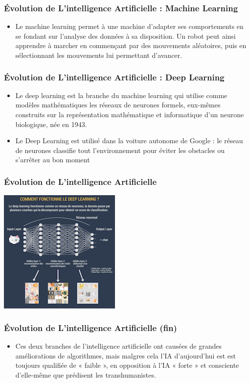 \documentclass{beamer}
\begin{document}
	\begin{frame}
	\frametitle{Évolution de L'intelligence  Artificielle : Machine Learning}
	\begin{itemize}
		\item Le machine learning permet à une machine d’adapter ses comportements en se fondant sur l’analyse des données à sa disposition. Un robot peut ainsi apprendre à marcher en commençant par des mouvements aléatoires, puis en sélectionnant les mouvements lui permettant d’avancer.
	\end{itemize}
	\end{frame}
	
	\begin{frame}
	\frametitle{Évolution de L'intelligence  Artificielle : Deep Learning}
	\begin{itemize}
		\itemsep1em
		\item Le deep learning est la branche du machine learning qui utilise comme modèles mathématiques les réseaux de neurones formels, eux-mêmes construits sur la représentation mathématique et informatique d’un neurone biologique, née en 1943.
		\item  Le Deep Learning est utilisé dans la voiture autonome  de Google : le réseau de  neurones 	classifie tout l’environnement pour éviter les obstacles ou s’arrêter au bon moment 
	\end{itemize}
	\end{frame}
	
	\begin{frame}
	\frametitle{Évolution de L'intelligence  Artificielle}
	
	\centerline{\includegraphics{deeplearning.png}}
	\end{frame}
	
		\begin{frame}
	\frametitle{Évolution de L'intelligence  Artificielle (fin)}
	\begin{itemize}
		\item Ces deux branches de l'intelligence artificielle ont causées de grandes améliorations de algorithmes, mais malgres cela l'IA d'aujourd'hui est est toujours qualifiée de « faible », en opposition à l’IA « forte » et consciente d’elle-même que prédisent les transhumanistes.

	\end{itemize}
	\end{frame}
	
\end{document}
